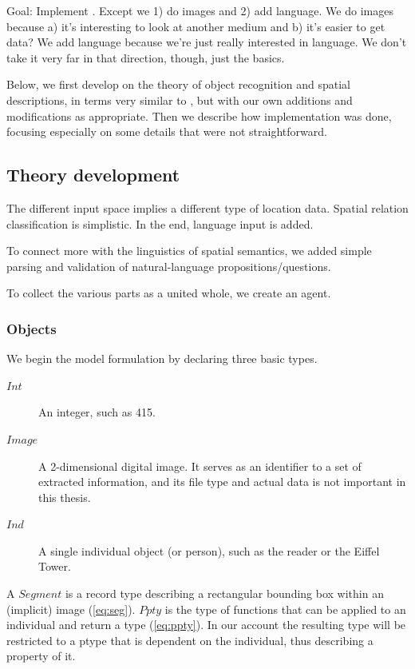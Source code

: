 \documentclass[11pt, a4paper]{article}
\begin{document}
Goal: Implement \cite{ttrspat}.
Except we 1) do images and 2) add language.
We do images because a) it's interesting to look at another medium and b) it's easier to get data?
We add language because we're just really interested in language.
We don't take it very far in that direction, though, just the basics.

Below, we first develop on the theory of object recognition and spatial descriptions, in terms very similar to \cite{ttrspat}, but with our own additions and modifications as appropriate.
Then we describe how implementation was done, focusing especially on some details that were not straightforward.



\subsection{Theory development}
\label{ssec:theory}

The different input space implies a different type of location data.
Spatial relation classification is simplistic.
In the end, language input is added.

To connect more with the linguistics of spatial semantics, we added simple parsing and validation of natural-language propositions/questions.

To collect the various parts as a united whole, we create an agent.



\subsubsection{Objects}

We begin the model formulation by declaring three basic types.

\begin{description}
\item [$Int$] An integer, such as 415.
\item [$Image$] A 2-dimensional digital image. It serves as an identifier to a set of extracted information, and its file type and actual data is not important in this thesis.
\item [$Ind$] A single individual object (or person), such as the reader or the Eiffel Tower.
\end{description}

A $Segment$ is a record type describing a rectangular bounding box within an (implicit) image (\autoref{eq:seg}).
$Ppty$ is the type of functions that can be applied to an individual and return a type (\autoref{eq:ppty}).
In our account the resulting type will be restricted to a ptype that is dependent on the individual, thus describing a property of it.
\end{document}
